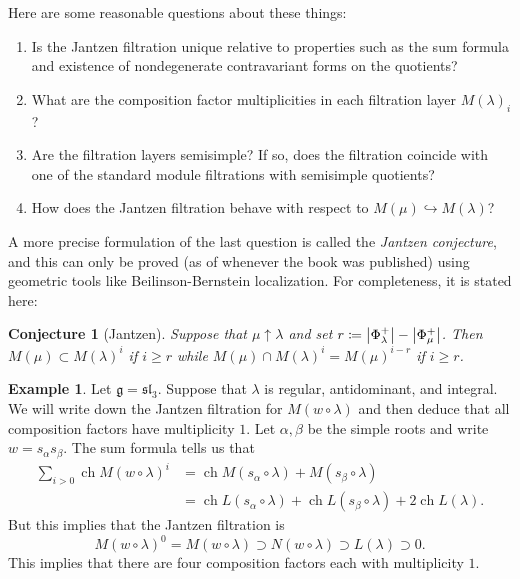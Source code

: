 \documentclass{amsart}
\newtheorem{conj}[thm]{Conjecture}
\theoremstyle{definition}
\newtheorem{exm}[thm]{Example}
\theoremstyle{remark}
\theoremstyle{plain}
\theoremstyle{definition}
\theoremstyle{remark}
\newcommand{\g}{\mathfrak{g}}
\newcommand{\mf}[1]{\mathfrak{#1}}
\newcommand{\1}{\mathbf{1}}
\newcommand{\2}{\mathbf{2}}
\newcommand{\3}{\mathbf{3}}
\DeclareMathOperator{\ch}{ch}
\begin{document}
Here are some reasonable questions about these things:
\begin{enumerate}
  \item Is the Jantzen filtration unique relative to properties such as the sum formula and existence of nondegenerate contravariant forms on the quotients?
  \item What are the composition factor multiplicities in each filtration layer $M(\lambda)_i$?
  \item Are the filtration layers semisimple? If so, does the filtration coincide with one of the standard module filtrations with semisimple quotients?
  \item How does the Jantzen filtration behave with respect to $M(\mu) \hookrightarrow M(\lambda)$?
\end{enumerate}

A more precise formulation of the last question is called the \textit{Jantzen conjecture}, and this can only be proved (as of whenever the book was published) using geometric tools like Beilinson-Bernstein localization. For completeness, it is stated here:

\begin{conj}[Jantzen]
  Suppose that $\mu \uparrow \lambda$ and set $r \coloneqq \abs{\Phi_{\lambda}^+} - \abs{\Phi_{\mu}^+}$. Then $M(\mu) \subset M(\lambda)^i$ if $i \geq r$ while $M(\mu) \cap M(\lambda)^i = M(\mu)^{i-r}$ if $i \geq r$.
\end{conj}


\begin{exm}
  Let $\g = \mf{sl}_3$. Suppose that $\lambda$ is regular, antidominant, and integral. We will write down the Jantzen filtration for $M(w \circ \lambda)$ and then deduce that all composition factors have multiplicity $1$. Let $\alpha, \beta$ be the simple roots and write $w = s_{\alpha} s_{\beta}$. The sum formula tells us that
  \begin{align*}
    \sum_{i>0} \ch M(w \circ \lambda)^i &= \ch M(s_{\alpha} \circ \lambda) + M(s_{\beta} \circ \lambda) \\
    &= \ch L(s_{\alpha} \circ \lambda) + \ch L(s_{\beta} \circ \lambda) + 2 \ch L(\lambda).
  \end{align*}
  But this implies that the Jantzen filtration is
  \[ M(w \circ \lambda)^0 = M(w \circ \lambda) \supset N(w \circ \lambda) \supset L(\lambda) \supset 0. \]
  This implies that there are four composition factors each with multiplicity $1$.
\end{exm}
\end{document}
